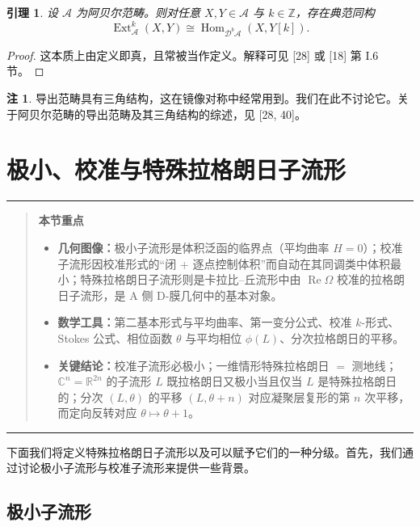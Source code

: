 \documentclass[11pt,a4paper]{article}
\theoremstyle{plain}
\newtheorem{lemma}[theorem]{引理}
\theoremstyle{definition}
\newtheorem{remark}[theorem]{注}
\newenvironment{keytakeaways}[1][本节重点]{%
  \par\addvspace{9pt}%
  \noindent\rule{\linewidth}{0.7pt}\par\nobreak
  \begin{quote}\noindent\textbf{#1}\par\small
}{%
  \end{quote}%
  \noindent\rule{\linewidth}{0.7pt}\par\addvspace{7pt}%
}
\begin{document}
\begin{lemma}
设 $\mathcal{A}$ 为阿贝尔范畴。则对任意 $X,Y\in\mathcal{A}$ 与 $k\in\mathbb{Z}$，存在典范同构
\[
\operatorname{Ext}^k_{\mathcal{A}}(X,Y)\cong\operatorname{Hom}_{\mathcal{D}^b\mathcal{A}}(X,Y[k]).
\]
\end{lemma}

\begin{proof}
这本质上由定义即真，且常被当作定义。解释可见 [28] 或 [18] 第 I.6 节。
\end{proof}

\begin{remark}
导出范畴具有三角结构，这在镜像对称中经常用到。我们在此不讨论它。关于阿贝尔范畴的导出范畴及其三角结构的综述，见 [28, 40]。
\end{remark}


\section{极小、校准与特殊拉格朗日子流形}

\begin{keytakeaways}
\begin{itemize}[leftmargin=1.6em,itemsep=1pt,topsep=2pt]
  \item \textbf{几何图像：}极小子流形是体积泛函的临界点（平均曲率 $H=0$）；校准子流形因校准形式的“闭 + 逐点控制体积”而自动在其同调类中体积最小；特殊拉格朗日子流形则是卡拉比–丘流形中由 $\operatorname{Re}\Omega$ 校准的拉格朗日子流形，是 A 侧 D-膜几何中的基本对象。
  \item \textbf{数学工具：}第二基本形式与平均曲率、第一变分公式、校准 $k$-形式、Stokes 公式、相位函数 $\theta$ 与平均相位 $\phi(L)$、分次拉格朗日的平移。
  \item \textbf{关键结论：}校准子流形必极小；一维情形特殊拉格朗日 $=$ 测地线；$\mathbb{C}^n=\mathbb{R}^{2n}$ 的子流形 $L$ 既拉格朗日又极小当且仅当 $L$ 是特殊拉格朗日的；分次 $(L,\theta)$ 的平移 $(L,\theta+n)$ 对应凝聚层复形的第 $n$ 次平移，而定向反转对应 $\theta\mapsto\theta+1$。
\end{itemize}
\end{keytakeaways}

下面我们将定义特殊拉格朗日子流形以及可以赋予它们的一种分级。首先，我们通过讨论极小子流形与校准子流形来提供一些背景。

\subsection{极小子流形}
\end{document}
